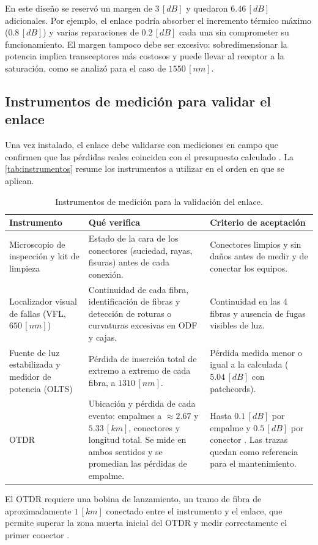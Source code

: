 En este diseño se reservó un margen de $3 \, [dB]$ y quedaron $6.46 \, [dB]$ adicionales. Por ejemplo, el enlace podría absorber el incremento térmico máximo ($0.8 \, [dB]$) y varias reparaciones de $0.2 \, [dB]$ cada una sin comprometer su funcionamiento. El margen tampoco debe ser excesivo: sobredimensionar la potencia implica transceptores más costosos y puede llevar al receptor a la saturación, como se analizó para el caso de $1550 \, [nm]$.


\subsection{Instrumentos de medición para validar el enlace}
\label{sec_5.4}
Una vez instalado, el enlace debe validarse con mediciones en campo que confirmen que las pérdidas reales coinciden con el presupuesto calculado \cite{b7, b17}. La \autoref{tab:instrumentos} resume los instrumentos a utilizar en el orden en que se aplican.

\begin{table}[H]
    \centering
    \footnotesize
    \begin{tabular}{|>{\raggedright\arraybackslash}m{3.2cm}|>{\raggedright\arraybackslash}m{5.6cm}|>{\raggedright\arraybackslash}m{5.2cm}|}
        \hline
        \textbf{Instrumento} & \textbf{Qué verifica} & \textbf{Criterio de aceptación} \\
        \hline
        Microscopio de inspección y kit de limpieza & Estado de la cara de los conectores (suciedad, rayas, fisuras) antes de cada conexión. & Conectores limpios y sin daños antes de medir y de conectar los equipos. \\
        \hline
        Localizador visual de fallas (VFL, $650 \, [nm]$) & Continuidad de cada fibra, identificación de fibras y detección de roturas o curvaturas excesivas en ODF y cajas. & Continuidad en las 4 fibras y ausencia de fugas visibles de luz. \\
        \hline
        Fuente de luz estabilizada y medidor de potencia (OLTS) & Pérdida de inserción total de extremo a extremo de cada fibra, a $1310 \, [nm]$. & Pérdida medida menor o igual a la calculada ($5.04 \, [dB]$ con patchcords). \\
        \hline
        OTDR & Ubicación y pérdida de cada evento: empalmes a $\approx 2.67$ y $5.33 \, [km]$, conectores y longitud total. Se mide en ambos sentidos y se promedian las pérdidas de empalme. & Hasta $0.1 \, [dB]$ por empalme y $0.5 \, [dB]$ por conector \cite{b7}. Las trazas quedan como referencia para el mantenimiento. \\
        \hline
    \end{tabular}
    \caption{Instrumentos de medición para la validación del enlace.}
    \label{tab:instrumentos}
\end{table}

El OTDR requiere una bobina de lanzamiento, un tramo de fibra de aproximadamente $1 \, [km]$ conectado entre el instrumento y el enlace, que permite superar la zona muerta inicial del OTDR y medir correctamente el primer conector \cite{b7, b17}.
